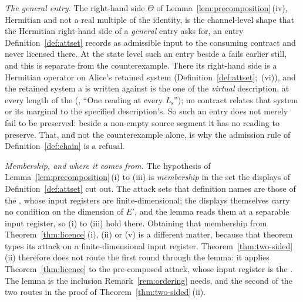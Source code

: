 
\begin{remark}\label{rem:precomposition-scope}
\emph{The general entry.} The right-hand side $\Theta$ of
Lemma~\ref{lem:precomposition}\,(iv), Hermitian and not a real multiple of the
identity, is the channel-level shape that the Hermitian right-hand side of a
\emph{general} entry asks for, an entry Definition~\ref{def:attset} records as
admissible input to the consuming contract and never licensed there. At the state level
such an entry beside a  fails earlier still, and this is
separate from the counterexample. There its right-hand side is a Hermitian
operator on Alice's retained system (Definition~\ref{def:attset};
\,(vi)), and the retained system a
 is written against is the one of the
\emph{virtual} description, at every length of the 
(, ``One reading at every $L_{\mathrm s}$''); no
contract relates that system or its marginal to the specified description's.
So such an entry does not merely fail to be preserved: beside a non-empty
source segment it has no reading to preserve. That, and not the
counterexample alone, is why the admission rule of
Definition~\ref{def:chain} is a refusal.

\emph{Membership, and where it comes from.} The hypothesis of
Lemma~\ref{lem:precomposition}\,(i) to (iii) is \emph{membership} in the set
the displays of Definition~\ref{def:attset} cut out. The attack sets that
definition names are those of the , whose input registers are
finite-dimensional; the displays themselves carry no condition on the
dimension of $E'$, and the lemma reads them at a separable input register,
so (i) to (iii) hold there.
Obtaining that membership from Theorem~\ref{thm:licence}\,(i), (ii) or (v) is
a different matter, because that theorem types its attack on a
finite-dimensional input register. Theorem~\ref{thm:two-sided}\,(ii)
therefore does not route the first round through the lemma: it applies
Theorem~\ref{thm:licence} to the pre-composed attack, whose input register is
the . The lemma is the inclusion
Remark~\ref{rem:ordering} needs, and the second of the two routes in the
proof of Theorem~\ref{thm:two-sided}\,(ii).


\end{remark}
